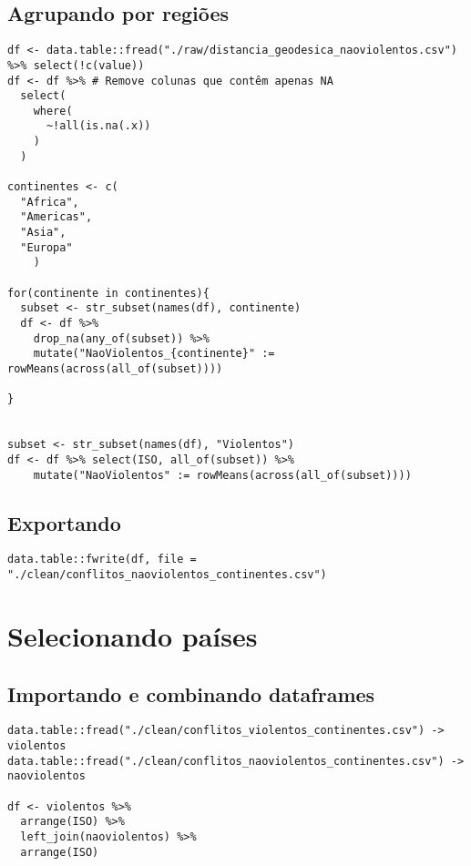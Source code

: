 \documentclass[11pt]{article}
\begin{document}
\subsection*{Agrupando por regiões}
\label{sec:org6191368}

\begin{verbatim}
df <- data.table::fread("./raw/distancia_geodesica_naoviolentos.csv") %>% select(!c(value))
df <- df %>% # Remove colunas que contêm apenas NA
  select(
    where(
      ~!all(is.na(.x))
    )
  )

continentes <- c(
  "Africa",
  "Americas",
  "Asia",
  "Europa"
    )

for(continente in continentes){
  subset <- str_subset(names(df), continente)
  df <- df %>%
    drop_na(any_of(subset)) %>%
    mutate("NaoViolentos_{continente}" := rowMeans(across(all_of(subset))))

}


subset <- str_subset(names(df), "Violentos")
df <- df %>% select(ISO, all_of(subset)) %>%
    mutate("NaoViolentos" := rowMeans(across(all_of(subset))))
\end{verbatim}




\subsection*{Exportando}
\label{sec:org0c2015f}

\begin{verbatim}
data.table::fwrite(df, file = "./clean/conflitos_naoviolentos_continentes.csv")
\end{verbatim}

\section*{Selecionando países}
\label{sec:org7441037}

\subsection*{Importando e combinando dataframes}
\label{sec:org5d34b97}

\begin{verbatim}
data.table::fread("./clean/conflitos_violentos_continentes.csv") -> violentos
data.table::fread("./clean/conflitos_naoviolentos_continentes.csv") -> naoviolentos

df <- violentos %>%
  arrange(ISO) %>%
  left_join(naoviolentos) %>%
  arrange(ISO)
\end{verbatim}
\end{document}
